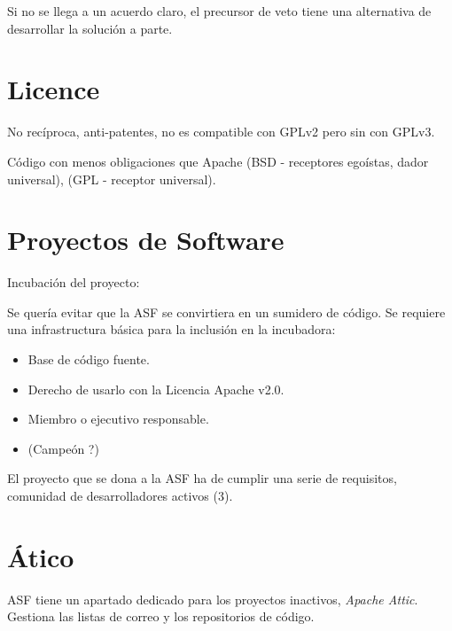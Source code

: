 \documentclass[11pt]{scrartcl}
\begin{document}
\par Si no se llega a un acuerdo claro, el precursor de veto tiene una alternativa de desarrollar la solución a parte.


\section{Licence}
\label{sec:licence}

\par No recíproca, anti-patentes, no es compatible con GPLv2 pero sin con GPLv3.

\par Código con menos obligaciones que Apache (BSD - receptores egoístas, dador universal), (GPL - receptor universal).


\section{Proyectos de Software}
\label{sec:software-projects}

\par Incubación del proyecto:

\par Se quería evitar que la ASF se convirtiera en un sumidero de código. Se requiere una infrastructura básica para la inclusión en la incubadora:
\begin{itemize}
	\item Base de código fuente.
	\item Derecho de usarlo con la Licencia Apache v2.0.
	\item Miembro o ejecutivo responsable.
	\item (Campeón ?)
\end{itemize}

\par El proyecto que se dona a la ASF ha de cumplir una serie de requisitos, comunidad de desarrolladores activos (3).


\section{Ático}
\label{sec:atico}

\par ASF tiene un apartado dedicado para los proyectos inactivos, \emph{Apache Attic}. Gestiona las listas de correo y los repositorios de código.
\end{document}
